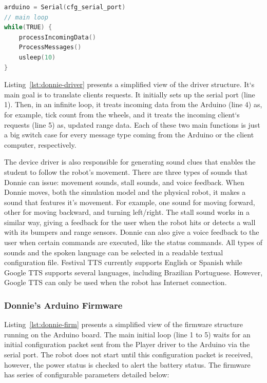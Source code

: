 \begin{lstlisting}[language=C,frame=lines,xleftmargin=5.0ex, caption={Player-based device driver.},label=lst:donnie-driver]  
arduino = Serial(cfg_serial_port)
// main loop
while(TRUE) {
    processIncomingData()
    ProcessMessages()
    usleep(10)
}
\end{lstlisting}


Listing~\ref{lst:donnie-driver} presents a simplified view of the driver structure. It`s main goal is to translate clients requests. It initially sets up the serial port (line 1). Then, in an infinite loop, it treats incoming data from the Arduino (line 4) as, for example, tick count from the wheels, and it treats the incoming client`s requests (line 5) as, updated range data. Each of these two main functions is just a big switch case for every message type coming from the Arduino or the client computer, respectively.

The device driver is also responsible for generating sound clues that enables the student to follow the robot's movement. 
There are three types of sounds that Donnie can issue: movement sounds, stall sounds, and voice feedback. When Donnie moves, both the simulation model and the physical robot, it makes a sound that features it's movement. For example, one sound for moving forward, other for moving backward, and turning left/right. The stall sound works in a similar way, giving a feedback for the user when the robot hits or detects a wall with its bumpers and range sensors. Donnie can also give a voice feedback to the user when certain commands are executed, like the status commands. All types of sounds and the spoken language can be selected in a readable textual configuration file. Festival TTS currently supports English or Spanish while Google TTS supports several languages, including Brazilian Portuguese. However, Google TTS can only be used when the robot has Internet connection.


\subsubsection{Donnie's Arduino Firmware}
\label{sec:firm}

Listing~\ref{lst:donnie-firm} presents a simplified view of the firmware structure running on the Arduino board. The main initial loop (line 1 to 5) waits for an initial configuration packet sent from the Player driver to the Arduino via the serial port. The robot does not start until this configuration packet is received, however, the power status is checked to alert the battery status. The firmware has series of configurable parameters detailed below: 

